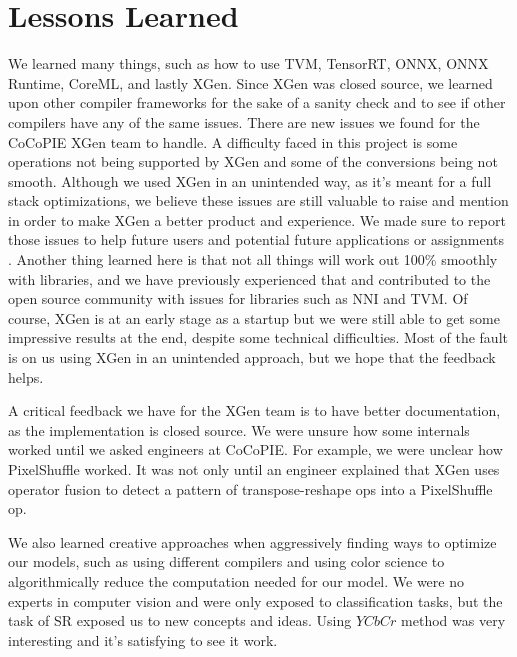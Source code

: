 \documentclass{article}
\begin{document}
\section{Lessons Learned}
We learned many things, such as how to use TVM, TensorRT, ONNX, ONNX Runtime, CoreML, and lastly XGen. Since XGen was closed source, we learned upon other compiler frameworks for the sake of a sanity check and to see if other compilers have any of the same issues. There are new issues we found for the CoCoPIE XGen team to handle. A difficulty faced in this project is some operations not being supported by XGen and some of the conversions being not smooth. Although we used XGen in an unintended way, as it's meant for a full stack optimizations, we believe these issues are still valuable to raise and mention in order to make XGen a better product and experience. We made sure to report those issues to help future users and potential future applications or assignments \cite{issue25, issue26}. Another thing learned here is that not all things will work out 100\% smoothly with libraries, and we have previously experienced that and contributed to the open source community with issues for libraries such as NNI and TVM. Of course, XGen is at an early stage as a startup but we were still able to get some impressive results at the end, despite some technical difficulties. Most of the fault is on us using XGen in an unintended approach, but we hope that the feedback helps.

A critical feedback we have for the XGen team is to have better documentation, as the implementation is closed source. We were unsure how some internals worked until we asked engineers at CoCoPIE. For example, we were unclear how PixelShuffle worked. It was not only until an engineer explained that XGen uses operator fusion to detect a pattern of transpose-reshape ops into a PixelShuffle op.

We also learned creative approaches when aggressively finding ways to optimize our models, such as using different compilers and using color science to algorithmically reduce the computation needed for our model. We were no experts in computer vision and were only exposed to classification tasks, but the task of SR exposed us to new concepts and ideas. Using $YCbCr$ method was very interesting and it's satisfying to see it work.
\end{document}
